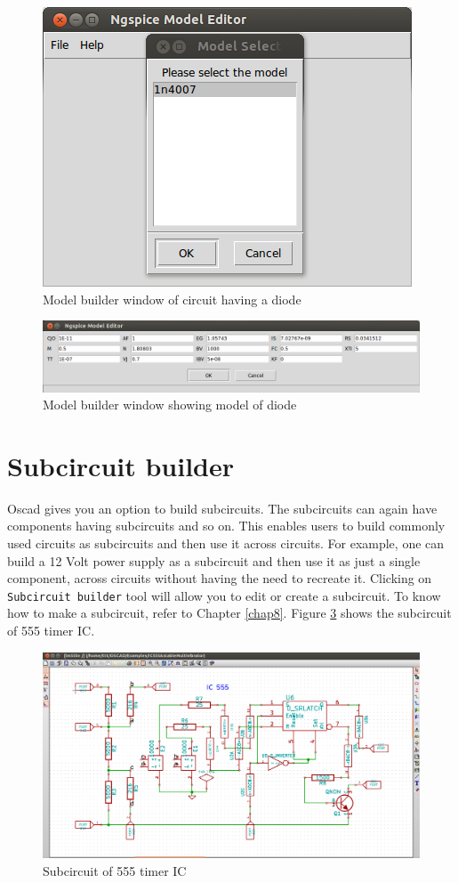 \begin{figure}
\begin{center}
\includegraphics[width=0.5\linewidth]{figures/model-builder-diode.png}
\caption{Model builder window of circuit having a diode}
\label{model-builder-diode}
\end{center}
\end{figure}

\begin{figure}
\begin{center}
\includegraphics[width=\linewidth]{figures/diode-model.png}
\caption{Model builder window showing model of diode}
\label{diode-model}
\end{center}
\end{figure}

\section{Subcircuit builder}

Oscad gives you an option to build subcircuits. The subcircuits can again have components having subcircuits and so on. This enables users to build commonly used circuits as subcircuits and then use it across circuits. For example, one can build a 12 Volt power supply as a subcircuit and then use it as just a single component, across circuits without having the need to recreate it. Clicking on {\tt Subcircuit builder} tool will allow you to edit or create a subcircuit. To know how to make a subcircuit, refer to Chapter \ref{chap8}. Figure \ref{lm555n-subcircuit} shows the subcircuit of 555 timer IC.

\begin{figure}
\begin{center}
\includegraphics[width=\linewidth]{figures/subcircuit.png}
\caption{Subcircuit of 555 timer IC}
\label{lm555n-subcircuit}
\end{center}
\end{figure}
